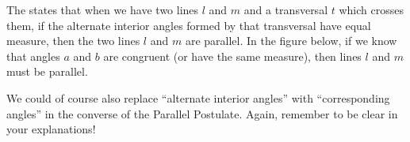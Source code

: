 \documentclass{ximera}
\begin{document}
\begin{definition}
The  states that when we have two lines $l$ and $m$ and a transversal $t$ which crosses them, if the alternate interior angles formed by that transversal have equal measure, then the two lines $l$ and $m$ are parallel. In the figure below, if we know that angles $a$ and $b$ are congruent (or have the same measure), then lines $l$ and $m$ must be parallel.

\begin{image}
\end{image}

\end{definition}

We could of course also replace ``alternate interior angles'' with ``corresponding angles'' in the converse of the Parallel Postulate. Again, remember to be clear in your explanations!
\end{document}
